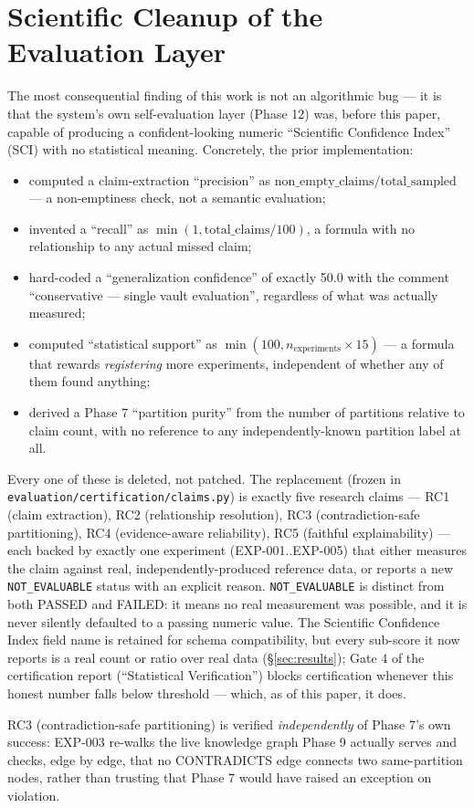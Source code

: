 \section{Scientific Cleanup of the Evaluation Layer}
\label{sec:cleanup}

The most consequential finding of this work is not an algorithmic bug --- it
is that the system's own self-evaluation layer (Phase 12) was, before this
paper, capable of producing a confident-looking numeric ``Scientific
Confidence Index'' (SCI) with no statistical meaning. Concretely, the prior
implementation:
\begin{itemize}
  \item computed a claim-extraction ``precision'' as
    $\mathrm{non\_empty\_claims} / \mathrm{total\_sampled}$ --- a
    non-emptiness check, not a semantic evaluation;
  \item invented a ``recall'' as $\min(1, \mathrm{total\_claims}/100)$,
    a formula with no relationship to any actual missed claim;
  \item hard-coded a ``generalization confidence'' of exactly 50.0 with the
    comment ``conservative --- single vault evaluation'', regardless of
    what was actually measured;
  \item computed ``statistical support'' as
    $\min(100, n_{\mathrm{experiments}} \times 15)$ --- a formula that
    rewards \emph{registering} more experiments, independent of whether any
    of them found anything;
  \item derived a Phase 7 ``partition purity'' from the number of
    partitions relative to claim count, with no reference to any
    independently-known partition label at all.
\end{itemize}
Every one of these is deleted, not patched. The replacement (frozen in
\texttt{evaluation/certification/claims.py}) is exactly five research
claims --- RC1 (claim extraction), RC2 (relationship resolution), RC3
(contradiction-safe partitioning), RC4 (evidence-aware reliability), RC5
(faithful explainability) --- each backed by exactly one experiment
(EXP-001..EXP-005) that either measures the claim against real,
independently-produced reference data, or reports a new
\texttt{NOT\_EVALUABLE} status with an explicit reason.
\texttt{NOT\_EVALUABLE} is distinct from both PASSED and FAILED: it means no real
measurement was possible, and it is never silently defaulted to a passing
numeric value. The Scientific Confidence Index field name is retained for
schema compatibility, but every sub-score it now reports is a real count or
ratio over real data (\S\ref{sec:results}); Gate 4 of the certification
report (``Statistical Verification'') blocks certification whenever this
honest number falls below threshold --- which, as of this paper, it does.

RC3 (contradiction-safe partitioning) is verified \emph{independently} of
Phase 7's own success: EXP-003 re-walks the live knowledge graph Phase 9
actually serves and checks, edge by edge, that no CONTRADICTS edge connects
two same-partition nodes, rather than trusting that Phase 7 would have
raised an exception on violation.
